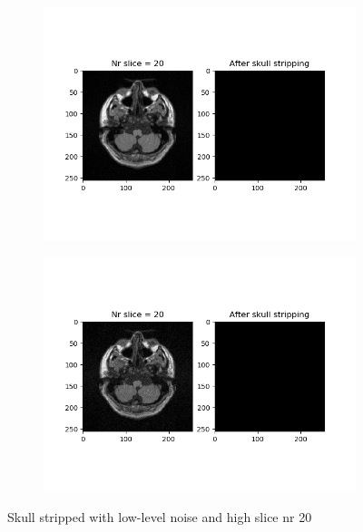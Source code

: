 \begin{figure}[H]
	\centering
	\begin{subfigure}[b]{0.35\linewidth}
		\includegraphics[scale=0.35]{figures/Module_08/M8_3.png}
	\end{subfigure}
		\begin{subfigure}[b]{0.35\linewidth}
		\includegraphics[scale=0.35]{figures/Module_08/M8_n3.png}
	\end{subfigure}
	\caption{Skull stripped with low-level noise and high slice nr 20}
	\label{fig:figures/m08_3}
\end{figure}

